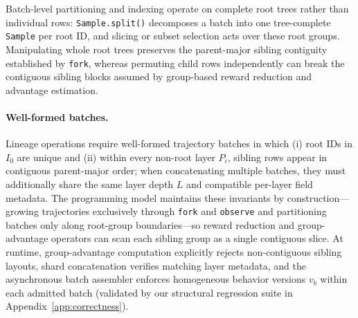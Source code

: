 \documentclass[10pt]{article}
\newcommand{\sample}{\texttt{Sample}}
\begin{document}
Batch-level partitioning and indexing operate on complete root trees rather than individual rows: \texttt{Sample.split()} decomposes a batch into one tree-complete \sample{} per root ID, and slicing or subset selection acts over these root groups.
Manipulating whole root trees preserves the parent-major sibling contiguity established by \texttt{fork}, whereas permuting child rows independently can break the contiguous sibling blocks assumed by group-based reward reduction and advantage estimation.

\paragraph{Well-formed batches.}
Lineage operations require well-formed trajectory batches in which (i) root IDs in $I_0$ are unique and (ii) within every non-root layer $P_i$, sibling rows appear in contiguous parent-major order; when concatenating multiple batches, they must additionally share the same layer depth $L$ and compatible per-layer field metadata.
The programming model maintains these invariants by construction---growing trajectories exclusively through \texttt{fork} and \texttt{observe} and partitioning batches only along root-group boundaries---so reward reduction and group-advantage operators can scan each sibling group as a single contiguous slice.
At runtime, group-advantage computation explicitly rejects non-contiguous sibling layouts, shard concatenation verifies matching layer metadata, and the asynchronous batch assembler enforces homogeneous behavior versions $v_b$ within each admitted batch (validated by our structural regression suite in Appendix~\ref{app:correctness}).
\end{document}
